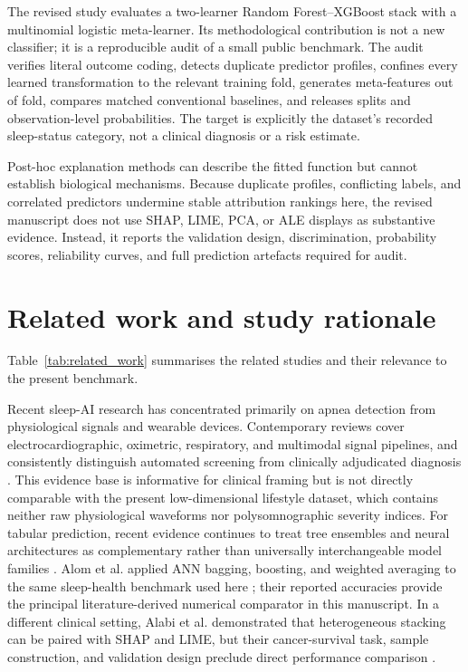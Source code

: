 \documentclass[a4paper,fleqn]{cas-dc}
\begin{document}
The revised study evaluates a two-learner Random Forest--XGBoost stack with a multinomial logistic meta-learner. Its methodological contribution is not a new classifier; it is a reproducible audit of a small public benchmark. The audit verifies literal outcome coding, detects duplicate predictor profiles, confines every learned transformation to the relevant training fold, generates meta-features out of fold, compares matched conventional baselines, and releases splits and observation-level probabilities. The target is explicitly the dataset's recorded sleep-status category, not a clinical diagnosis or a risk estimate.

Post-hoc explanation methods can describe the fitted function but cannot establish biological mechanisms. Because duplicate profiles, conflicting labels, and correlated predictors undermine stable attribution rankings here, the revised manuscript does not use SHAP, LIME, PCA, or ALE displays as substantive evidence. Instead, it reports the validation design, discrimination, probability scores, reliability curves, and full prediction artefacts required for audit.

\section{Related work and study rationale}

Table~\ref{tab:related_work} summarises the related studies and their relevance to the present benchmark.

Recent sleep-AI research has concentrated primarily on apnea detection from physiological signals and wearable devices. Contemporary reviews cover electrocardiographic, oximetric, respiratory, and multimodal signal pipelines, and consistently distinguish automated screening from clinically adjudicated diagnosis \cite{bazoukis2023,tyagi2023,abdalrazaq2024,giorgi2025}. This evidence base is informative for clinical framing but is not directly comparable with the present low-dimensional lifestyle dataset, which contains neither raw physiological waveforms nor polysomnographic severity indices. For tabular prediction, recent evidence continues to treat tree ensembles and neural architectures as complementary rather than universally interchangeable model families \cite{borisov2024}. Alom et al. applied ANN bagging, boosting, and weighted averaging to the same sleep-health benchmark used here \cite{alom2024}; their reported accuracies provide the principal literature-derived numerical comparator in this manuscript. In a different clinical setting, Alabi et al. demonstrated that heterogeneous stacking can be paired with SHAP and LIME, but their cancer-survival task, sample construction, and validation design preclude direct performance comparison \cite{alabi2023}.
\end{document}
